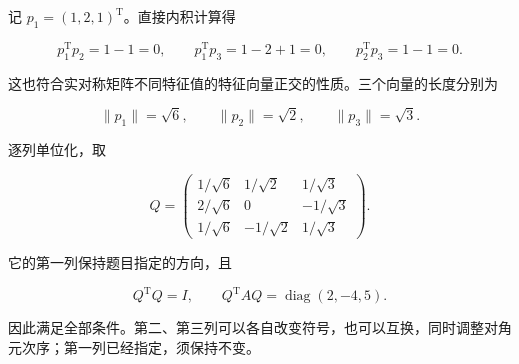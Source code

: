 \documentclass[UTF8,11pt,fontset=windows]{ctexart}
\begin{document}
记 $p_1=(1,2,1)^{\mathrm T}$。直接内积计算得

$$
p_1^{\mathrm T}p_2=1-1=0,
\qquad p_1^{\mathrm T}p_3=1-2+1=0,
\qquad p_2^{\mathrm T}p_3=1-1=0.
$$

这也符合实对称矩阵不同特征值的特征向量正交的性质。三个向量的长度分别为

$$
\|p_1\|=\sqrt6,\qquad\|p_2\|=\sqrt2,
\qquad\|p_3\|=\sqrt3.
$$

逐列单位化，取

$$
\boxed{Q=\begin{pmatrix}
1/\sqrt6&1/\sqrt2&1/\sqrt3\\
2/\sqrt6&0&-1/\sqrt3\\
1/\sqrt6&-1/\sqrt2&1/\sqrt3
\end{pmatrix}}.
$$

它的第一列保持题目指定的方向，且

$$
Q^{\mathrm T}Q=I,\qquad
Q^{\mathrm T}AQ=\operatorname{diag}(2,-4,5).
$$

因此满足全部条件。第二、第三列可以各自改变符号，也可以互换，同时调整对角元次序；第一列已经指定，须保持不变。
\end{document}
